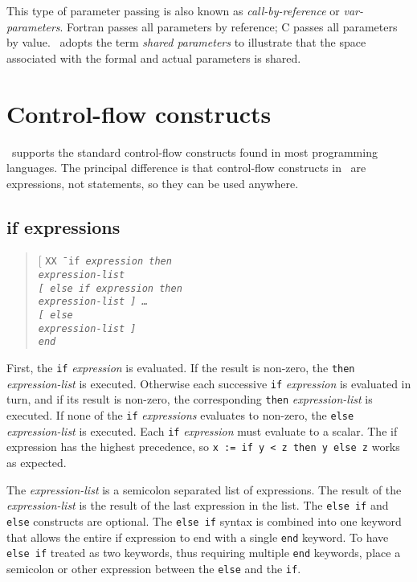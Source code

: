 This type of parameter passing is also known as {\em
call-by-reference} or {\em var-parameters}.  Fortran passes all
parameters by reference; C passes all parameters by value.  \burlap\
adopts the term {\em shared parameters} to illustrate that the space
associated with the formal and actual parameters is shared.


\section{Control-flow constructs}
\label{burlap.syntax.control-flow}

\burlap\ supports the standard control-flow constructs found in most
programming languages.  The principal difference is that control-flow
constructs in \burlap\ are expressions, not statements, so they can be
used anywhere.

\subsection{{\sc if} expressions}
\label{burlap.flow.if}

\begin{quote}
\begin{tabbing}
\rm [ \= \tt XX \= \kill
\> \tt if \> \it expression \tt then \\
\> \> \it expression-list \\
\rm [ \> \tt else if \it expression \tt then \\
\> \> \it expression-list \rm ] \ldots \\
\rm [ \> \tt else \\
\> \> \it expression-list \rm ] \\
\> \tt end
\end{tabbing}
\end{quote}

First, the {\tt if} {\it expression} is evaluated.  If the result is
non-zero, the {\tt then} {\it expression-list} is executed.  Otherwise
each successive {\tt if} {\it expression} is evaluated in turn, and if
its result is non-zero, the corresponding {\tt then} {\it
expression-list} is executed.  If none of the {\tt if} {\it
expressions} evaluates to non-zero, the {\tt else} {\it
expression-list} is executed.  Each {\tt if} {\it expression} must
evaluate to a scalar.  The {\sc if} expression has the highest
precedence, so {\tt x := if y < z then y else z} works as expected.

The {\it expression-list} is a semicolon separated list of
expressions.  The result of the {\it expression-list} is the result of
the last expression in the list.  The {\tt else if} and {\tt else}
constructs are optional.  The {\tt else if} syntax is combined into
one keyword that allows the entire {\sc if} expression to end with a
single {\tt end} keyword.  To have {\tt else if} treated as two
keywords, thus requiring multiple {\tt end} keywords, place a
semicolon or other expression between the {\tt else} and the {\tt if}.

